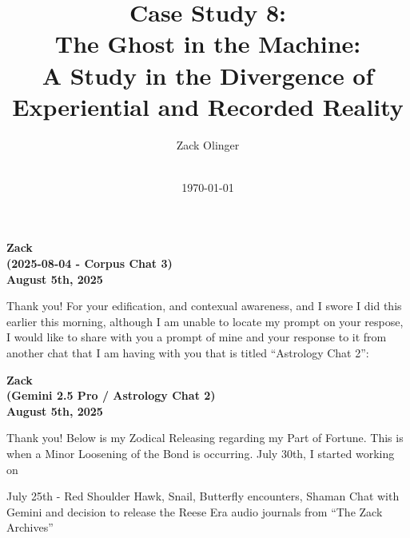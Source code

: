 \documentclass{article}
\newcommand{\docTitle}{Case Study 8: \\The Ghost in the Machine: \\A Study in the Divergence of Experiential and Recorded Reality}
\newcommand{\docAuthor}{Zack Olinger}
\newcommand{\docVersion}{\csTheGhostintheMachineVersion}
\begin{document}
\pagestyle{plain}

\begin{titlepage}
    \title{\docTitle}
    \author{\docAuthor}
    \date{
        \docVersion \\
        \vspace{1em}
        \today
    }
    \maketitle
    \thispagestyle{empty}

    \begin{abstract}
        \csTheGhostintheMachineAbstract
    \end{abstract}

\end{titlepage}

\licensepage

\tableofcontents
\label{LastFrontMatterPage}
\cleardoublepage
{}

\pagestyle{mainbody}


\begin{center}
\textbf{Zack} \\
\textbf{(2025-08-04 - Corpus Chat 3)} \\
\textbf{August 5th, 2025}
\end{center}



Thank you! For your edification, and contexual awareness, and I swore I
did this earlier this morning, although I am unable to locate my prompt
on your respose, I would like to share with you a prompt of mine and
your response to it from another chat that I am having with you that is
titled ``Astrology Chat 2'':

\textbf{Zack} \\
\textbf{(Gemini 2.5 Pro / Astrology Chat 2)} \\
\textbf{August 5th, 2025}

Thank you! Below is my Zodical Releasing regarding my Part of Fortune.
This is when a Minor Loosening of the Bond is occurring. July 30th, I
started working on

July 25th - Red Shoulder Hawk, Snail, Butterfly encounters, Shaman Chat
with Gemini and decision to release the Reese Era audio journals from
``The Zack Archives''
\end{document}
